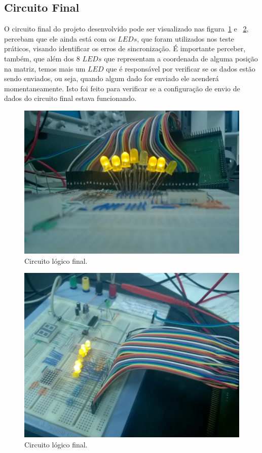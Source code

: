 \documentclass[12pt]{article}
\begin{document}
\subsection{Circuito Final}
O circuito final do projeto desenvolvido pode ser visualizado nas figura~\ref{fig:c1} e ~\ref{fig:c2}, percebam que ele ainda está com os $LEDs$, que foram utilizados nos teste práticos, visando identificar os erros de sincronização. É importante perceber, também, que além dos 8 $LEDs$ que representam a coordenada de alguma posição na matriz, temos mais um $LED$ que é responsável por verificar se os dados estão sendo enviados, ou seja, quando algum dado for enviado ele acenderá momentaneamente. Isto foi feito para verificar se a configuração de envio de dados do circuito final estava funcionando.

\begin{figure}[h]
\centering
\includegraphics[width=.7\textwidth]{img/c1.jpg}
\caption{Circuito lógico final.}
\label{fig:c1}
\end{figure}

\begin{figure}[h]
\centering
\includegraphics[width=.7\textwidth]{img/c2.jpg}
\caption{Circuito lógico final.}
\label{fig:c2}
\end{figure}
\end{document}
